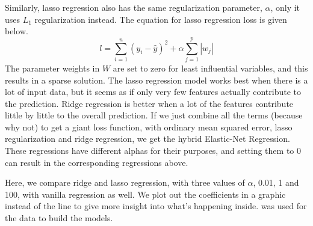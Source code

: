 \documentclass{article}
\newcommand{\code}[1]{{\fontfamily{zi4} \selectfont{#1}}}
\begin{document}
Similarly, lasso regression also has the same regularization parameter, $\alpha$, only it uses $L_1$ regularization instead. The equation for lasso regression loss is given below.
$$l = \sum_{i=1}^n (y_i - \hat{y})^2 + \alpha \sum_{j=1}^p |w_j|$$
The parameter weights in $W$ are set to zero for least influential variables, and this results in a sparse solution. The lasso regression model works best when there is a lot of input data, but it seems as if only very few features actually contribute to the prediction. Ridge regression is better when a lot of the features contribute little by little to the overall prediction. If we just combine all the terms (because why not) to get a giant loss function, with ordinary mean squared error, lasso regularization and ridge regression, we get the hybrid Elastic-Net Regression. These regressions have different alphas for their purposes, and setting them to 0 can result in the corresponding regressions above.

Here, we compare ridge and lasso regression, with three values of $\alpha$, 0.01, 1 and 100, with vanilla regression as well. We plot out the coefficients in a graphic instead of the line to give more insight into what's happening inside. \code{sklearn.datasets.load\_boston} was used for the data to build the models.
\end{document}
